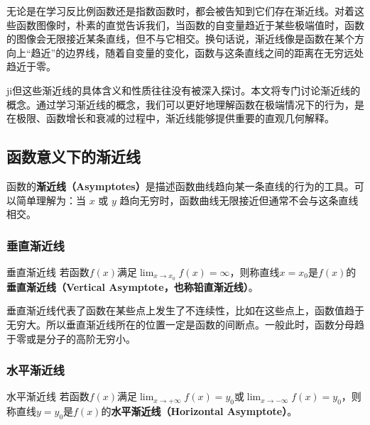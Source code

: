 
\begin{issues}
\issueDraft
\end{issues}

无论是在学习反比例函数还是指数函数时，都会被告知到它们存在渐近线。对着这些函数图像时，朴素的直觉告诉我们，当函数的自变量趋近于某些极端值时，函数的图像会无限接近某条直线，但不与它相交。换句话说，渐近线像是函数在某个方向上“趋近”的边界线，随着自变量的变化，函数与这条直线之间的距离在无穷远处趋近于零。

ji但这些渐近线的具体含义和性质往往没有被深入探讨。本文将专门讨论渐近线的概念。通过学习渐近线的概念，我们可以更好地理解函数在极端情况下的行为，是在极限、函数增长和衰减的过程中，渐近线能够提供重要的直观几何解释。

\subsection{函数意义下的渐近线}

函数的\textbf{渐近线（Asymptotes）}是描述函数曲线趋向某一条直线的行为的工具。可以简单理解为：当  $x$  或  $y$  趋向无穷时，函数曲线无限接近但通常不会与这条直线相交。
\subsubsection{垂直渐近线}

\begin{definition}{垂直渐近线}
若函数$f(x)$满足$\displaystyle \lim_{x\to x_0}f(x)=\infty$，则称直线$x=x_0$是$f(x)$的\textbf{垂直渐近线（Vertical Asymptote，也称铅直渐近线）}。
\end{definition}

垂直渐近线代表了函数在某些点上发生了不连续性，比如在这些点上，函数值趋于无穷大。所以垂直渐近线所在的位置一定是函数的间断点。一般此时，函数分母趋于零或是分子的高阶无穷小。

\subsubsection{水平渐近线}

\begin{definition}{水平渐近线}
若函数$f(x)$满足$\displaystyle \lim_{x\to +\infty}f(x)=y_0$或$\displaystyle \lim_{x\to -\infty}f(x)=y_0$，则称直线$y=y_0$是$f(x)$的\textbf{水平渐近线（Horizontal Asymptote）}。
\end{definition}

